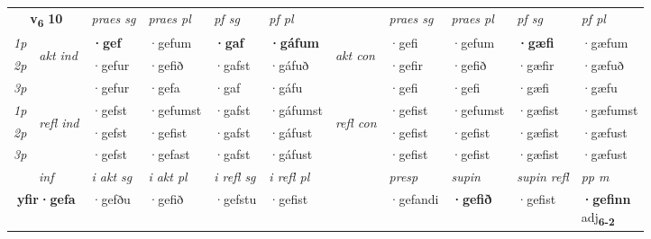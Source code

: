 \noindent
\begin{tabular}{lllllllllll} \toprule
\multicolumn{2}{c}{\textbf{v{\textsubscript{6}}} \Large{\textbf{10}}}  &  \textit{praes sg}  & \textit{praes pl}  &\textit{ pf sg} & \textit{pf pl} &  &  \textit{praes sg}  & \textit{praes pl}  & \textit{pf sg} & \textit{pf pl } \\*
	\cmidrule{3-6} \cmidrule{8-11}
 {\textit{1p}} & \multirow{3}{*}{\begin{turn}{90}\textit{akt ind}\end{turn}} & \textbf{·gef} & ·gefum & \textbf{·gaf} & \textbf{·gáfum} & \multirow{3}{*}{\begin{turn}{90}\textit{akt con}\end{turn}} &·gefi & ·gefum & \textbf{·gæfi} & ·gæfum\\*
 {\textit{2p}} &  &  ·gefur  & ·gefið & ·gafst & ·gáfuð & & ·gefir & ·gefið & ·gæfir & ·gæfuð \\*
{\textit{3p}} &  & ·gefur & ·gefa & ·gaf & ·gáfu & & ·gefi & ·gefi& ·gæfi & ·gæfu \\*
\cmidrule{3-6} \cmidrule{8-11}
 {\textit{1p}} & \multirow{3}{*}{\begin{turn}{90}\textit{refl ind}\end{turn}}  & ·gefst & ·gefumst & ·gafst & ·gáfumst & \multirow{3}{*}{\begin{turn}{90}\textit{refl con}\end{turn}}  &·gefist & ·gefumst & ·gæfist & ·gæfumst \\*
 {\textit{2p}} &  & ·gefst & ·gefist & ·gafst & ·gáfust & &·gefist & ·gefist & ·gæfist & ·gæfust \\*
 {\textit{3p}}  & & ·gefst & ·gefast & ·gafst & ·gáfust & & ·gefist & ·gefist& ·gæfist & ·gæfust \\*
\cmidrule{3-6} \cmidrule{8-11}

   \multicolumn{2}{c}{\textit{inf}}  & \textit{i akt sg} & \textit{i akt pl} & \textit{i refl sg} & \textit{i refl pl} && \textit{presp} & \textit{supin} & \textit{supin refl} & \textit{pp m} \\*
  \multicolumn{2}{c}{\textbf{yfir\allowbreak ·gefa}} & ·gefðu  & ·gefið & ·gefstu & ·gefist && ·gefandi &  \textbf{·gefið} & ·gefist & \specialcell{\textbf{·gefinn} \\ adj\textbf{\textsubscript{6-2}}} \\*
\end{tabular}

